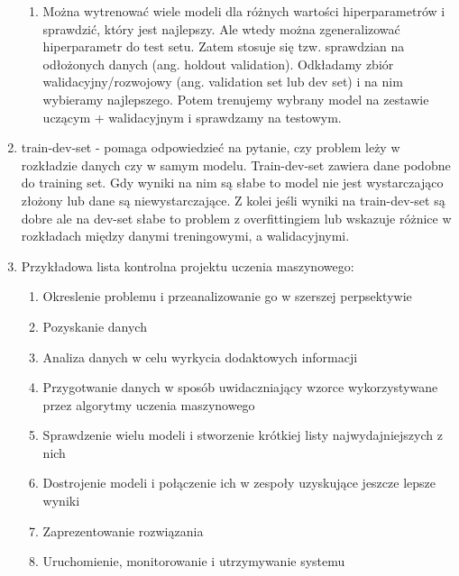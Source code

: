 \documentclass[polish,12pt,a4paper]{article}
\begin{document}
\begin{enumerate}
\begin{enumerate}
			\item Można wytrenować wiele modeli dla różnych wartości hiperparametrów i sprawdzić, który jest najlepszy. Ale wtedy można zgeneralizować hiperparametr do test setu. Zatem stosuje się tzw. sprawdzian na odłożonych danych (ang. holdout validation). Odkładamy zbiór walidacyjny/rozwojowy (ang. validation set lub dev set) i na nim wybieramy najlepszego. Potem trenujemy wybrany model na zestawie uczącym + walidacyjnym i sprawdzamy na testowym.
		\end{enumerate}
		\item train-dev-set - pomaga odpowiedzieć na pytanie, czy problem leży w rozkładzie danych czy w samym modelu. Train-dev-set zawiera dane podobne do training set. Gdy wyniki na nim są słabe to model nie jest wystarczająco złożony lub dane są niewystarczające. Z kolei jeśli wyniki na train-dev-set są dobre ale na dev-set słabe to problem z overfittingiem lub wskazuje różnice w rozkładach między danymi treningowymi, a walidacyjnymi.
		
		\item Przykładowa lista kontrolna projektu uczenia maszynowego:
		\begin{enumerate}
			\item Okreslenie problemu i przeanalizowanie go w szerszej perpsektywie
			\item Pozyskanie danych
			\item Analiza danych w celu wyrkycia dodaktowych informacji
			\item Przygotwanie danych w sposób uwidaczniający wzorce wykorzystywane przez algorytmy uczenia maszynowego
			\item Sprawdzenie wielu modeli i stworzenie krótkiej listy najwydajniejszych z nich
			\item Dostrojenie modeli i połączenie ich w zespoły uzyskujące jeszcze lepsze wyniki
			\item Zaprezentowanie rozwiązania
			\item Uruchomienie, monitorowanie i utrzymywanie systemu
		\end{enumerate}
		
	\end{enumerate}
	
	\newpage
\end{document}
